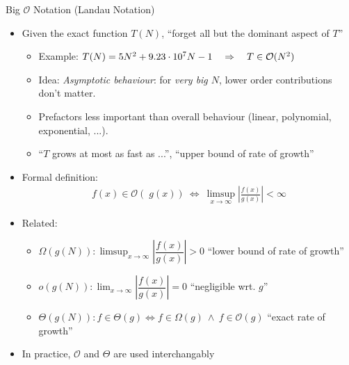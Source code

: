\begin{frame}{Big $\mathcal{O}$ Notation (Landau Notation)}
%
\begin{itemize}
\item Given the exact function $T(N)$, \enquote{forget all but the dominant aspect of $T$}
	\begin{itemize}
	\item Example: $T(N) = 5 N^2 + 9.23 \cdot 10^7 N - 1 \quad \Rightarrow \quad T \in \mathcal{O}(N^2)$
	\item Idea: \emph{Asymptotic behaviour}: for \emph{very big $N$}, lower order contributions don't matter.
	\item Prefactors less important than overall behaviour (linear, polynomial, exponential, ...).
	\item \enquote{$T$ grows at most as fast as ...}, \enquote{upper bound of rate of growth}
	\end{itemize}
\item Formal definition:
	\vspace{-4pt}
	\begin{align*}
		f(x) \in \mathcal{O}\left(\phantom{\Big.} g(x)\right)
		~
		\Leftrightarrow
		~
		\limsup_{x \to \infty} 
			\left|
				\frac
					{f(x)}
					{g(x)}
			\right|
		< \infty
	\end{align*}
	\vspace{-6pt}
\item Related:
	\begin{itemize}
	\item $\Omega(g(N)) : \limsup_{x \to \infty} \left| \dfrac{f(x)}{g(x)} \right| > 0$ \tabto{7.5cm} \enquote{lower bound of rate of growth}
	\item $o(g(N)) : \lim_{x \to \infty} \left| \dfrac{f(x)}{g(x)} \right| = 0$         \tabto{7.5cm} \enquote{negligible wrt. $g$}
	\item $\Theta(g(N)) : f \in \Theta(g) \Leftrightarrow f \in \Omega(g) ~\land~ f \in \mathcal{O}(g)$ \tabto{7.5cm} \enquote{exact rate of growth}
	\end{itemize}
	\vspace{4pt}
\item In practice, $\mathcal{O}$ and $\Theta$ are used interchangably
\end{itemize}
%
\end{frame}



